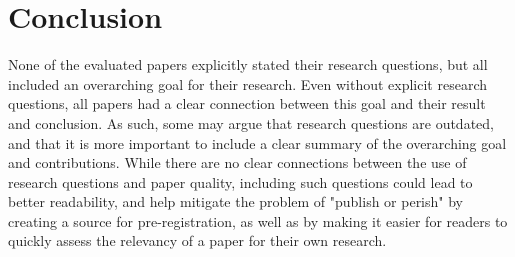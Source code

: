 \section{Conclusion}
None of the evaluated papers explicitly stated their research questions, but all included an overarching goal for their research. Even without explicit research questions, all papers had a clear connection between this goal and their result and conclusion. As such, some may argue that research questions are outdated, and that it is more important to include a clear summary of the overarching goal and contributions. While there are no clear connections between the use of research questions and paper quality, including such questions could lead to better readability, and help mitigate the problem of "publish or perish" by creating a source for pre-registration, as well as by making it easier for readers to quickly assess the relevancy of a paper for their own research.

